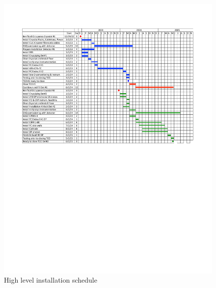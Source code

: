 \begin{figure}[htbp]
\begin{center}
\includegraphics[width=\textwidth]{far-detector-single-phase/figures/TP-Schedule-Feb2018.pdf}
\caption{High level installation schedule}
\label{Install-Schedule}
\end{center}
\end{figure}



